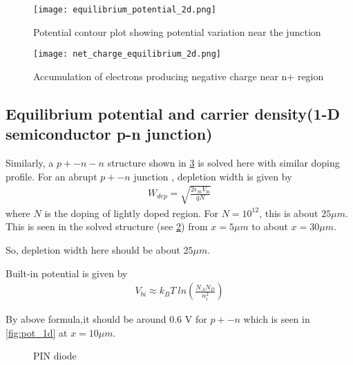 \begin{figure}[h!]
     \centering
        \texttt{[image: equilibrium\_potential\_2d.png]}
         \caption{Potential contour plot showing potential variation near the junction}
         \label{fig:pot_2d}
     \end{figure}

\begin{figure}[h!]
     \centering
        \texttt{[image: net\_charge\_equilibrium\_2d.png]}
         \caption{Accumulation of electrons producing negative charge near n+ region}
         \label{fig:pot_2d}
     \end{figure}

\subsection{Equilibrium potential and carrier density(1-D semiconductor p-n junction)}
Similarly, a $p+-n-n$ structure shown in \ref{fig:PIN} is solved here with similar doping profile. 
For an abrupt $p+-n$ junction \cite{bart}, depletion width is given by 
\begin{align*}
W_{dep} = \sqrt{\frac{2\epsilon_{Si} V_{bi}}{q N}} 
\end{align*}
where $N$ is the doping of lightly doped region.
For $N=10^{12}$, this is about $25 \mu m$. This is seen in the solved structure (see \ref{fig:pot_2d}) from $x=5 \mu m$ to about $x=30 \mu m$.

So, depletion width here should be about $25 \mu m$.

Built-in potential is given by 
\begin{align*}
V_{bi} \approx k_B T\ ln\left(\frac{N_A N_D}{n_i^2}\right)
\end{align*}

By above formula,it should be around 0.6 V for $p+-n$ which is seen in \ref{fig:pot_1d} at $x=10 \mu m$.

\begin{figure}[h!]
\caption{PIN diode}
\label{fig:PIN}
\end{figure}

